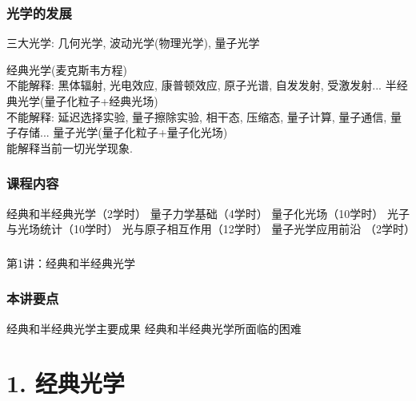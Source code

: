 \begin{frame}
    \frametitle{光学的发展}
    三大光学: 几何光学, 波动光学(物理光学), 量子光学
    \begin{itemize}
        \Item 经典光学(麦克斯韦方程) \\
        不能解释: 黑体辐射, 光电效应, 康普顿效应, 原子光谱, 自发发射, 受激发射...
        \Item 半经典光学(量子化粒子+经典光场)  \\
        不能解释: 延迟选择实验, 量子擦除实验, 相干态, 压缩态, 量子计算, 量子通信, 量子存储...
        \Item 量子光学(量子化粒子+量子化光场)  \\
        能解释当前一切光学现象. 
    \end{itemize}     
\end{frame}

\begin{frame}
    \frametitle{课程内容}
        \begin{enumerate}
            \Item 经典和半经典光学（2学时）
            \Item 量子力学基础（4学时）
            \Item 量子化光场（10学时）
            \Item 光子与光场统计（10学时）
            \Item 光与原子相互作用（12学时）
            \Item 量子光学应用前沿 （2学时）
        \end{enumerate}
  \end{frame}

\begin{frame} [plain]
    \frametitle{}
    \Background[1] 
    \begin{center}
    {\huge 第1讲：经典和半经典光学}
    \end{center}  
    \addtocounter{framenumber}{-1}   
\end{frame}

\begin{frame}
      \frametitle{本讲要点}
      \begin{enumerate}
        \Item 经典和半经典光学主要成果
        \Item 经典和半经典光学所面临的困难
    \end{enumerate}
      
\end{frame}

\section{1. 经典光学}


